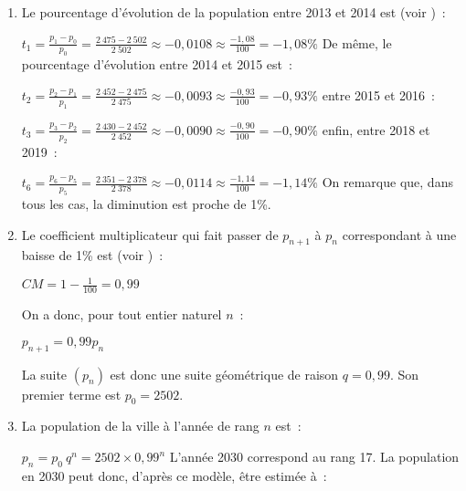 \begin{corrige}
     \begin{enumerate}
          \item
          Le pourcentage d'évolution de la population entre 2013 et 2014 est (voir )~:
          \par
          $ t_1 = \frac{ p_1 - p_0 }{ p_0 } = \frac{ 2~475 - 2~502 }{ 2~502 } $\nosp$ \approx -0,0108 \approx \frac{ -1,08 }{ 100 } = -1,08\%$
          \medskip
          De même, le pourcentage d'évolution entre 2014 et 2015 est~:
          \par
          $ t_2 = \frac{ p_2 - p_1}{ p_1 } = \frac{ 2~452 - 2~475 }{ 2~475 } $\nosp$ \approx -0,0093 \approx \frac{ -0,93 }{ 100 } = -0,93\%$
          \medskip
          entre 2015 et 2016~:
          \par
          $ t_3 = \frac{ p_3 - p_2}{ p_2 } = \frac{ 2~430 - 2~452 }{ 2~452 } $\nosp$ \approx -0,0090 \approx \frac{ -0,90 }{ 100 } = -0,90\%$
          \medskip
          enfin, entre 2018 et 2019~:
          \par
          $ t_6 = \frac{ p_6 - p_5}{ p_5 } = \frac{ 2~351 - 2~378 }{ 2~378 } $\nosp$ \approx -0,0114 \approx \frac{ -1,14 }{ 100 } = -1,14\%$
          \medskip
          On remarque que, dans tous les cas, la diminution est proche de 1\%.
          \item
          Le coefficient multiplicateur qui fait passer de $p_{n+1}$ à $p_n$ correspondant à une baisse de 1\% est (voir )~:
          \par
          $ CM=1- \frac{ 1 }{ 100 } =0,99 $
          \par
          On a donc, pour tout entier naturel $n$~:
          \par
          $p_{n+1} = 0,99p_n $
          \par
          La suite $ \left( p_n \right) $ est donc une suite géométrique de raison $ q = 0,99. $ Son premier terme est $ p_0=2502. $
          \item
          La population de la ville à l'année de rang $n$ est~:
          \par
          $ p_n=p_0\ q^n = 2502 \times 0,99^n$
          \medskip
          L'année 2030 correspond au rang 17. La population en 2030 peut donc, d'après ce modèle, être estimée à~:
          \par

\end{enumerate}
\end{corrige}

